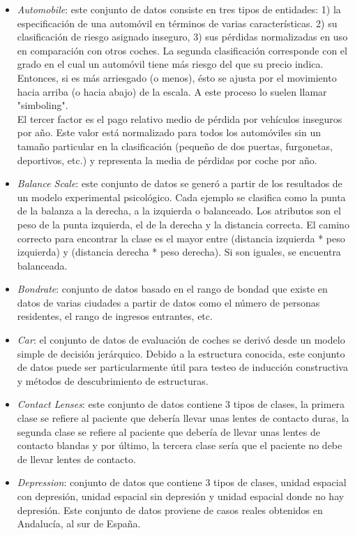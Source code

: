 			\begin{itemize}
				\item \textit{Automobile}: este conjunto de datos consiste en tres tipos de entidades: 1) la especificación de una automóvil en términos de varias características. 2) su clasificación de riesgo asignado inseguro, 3) sus pérdidas normalizadas en uso en comparación con otros coches. La segunda clasificación corresponde con el grado en el cual un automóvil tiene más riesgo del que su precio indica. Entonces, si es más arriesgado (o menos), ésto se ajusta por el movimiento hacia arriba (o hacia abajo) de la escala. A este proceso lo suelen llamar "simboling".\\

El tercer factor es el pago relativo medio de pérdida por vehículos inseguros por año. Este valor está normalizado para todos los automóviles sin un tamaño particular en la clasificación (pequeño de dos puertas, furgonetas, deportivos, etc.) y representa la media de pérdidas por coche por año.
				\item \textit{Balance Scale}: este conjunto de datos se generó a partir de los resultados de un modelo experimental psicológico. Cada ejemplo se clasifica como la punta de la balanza a la derecha, a la izquierda o balanceado. Los atributos son el peso de la punta izquierda, el de la derecha y la distancia correcta. El camino correcto para encontrar la clase es el mayor entre (distancia izquierda * peso izquierda) y (distancia derecha * peso derecha). Si son iguales, se encuentra balanceada.
				\item \textit{Bondrate}: conjunto de datos basado en el rango de bondad que existe en datos de varias ciudades a partir de datos como el número de personas residentes, el rango de ingresos entrantes, etc.
				\item \textit{Car}: el conjunto de datos de evaluación de coches se derivó desde un modelo simple de decisión jerárquico. Debido a la estructura conocida, este conjunto de datos puede ser particularmente útil para testeo de inducción constructiva y métodos de descubrimiento de estructuras.
				\item \textit{Contact Lenses}: este conjunto de datos contiene 3 tipos de clases, la primera clase se refiere al paciente que debería llevar unas lentes de contacto duras, la segunda clase se refiere al paciente que debería de llevar unas lentes de contacto blandas y por último, la tercera clase sería que el paciente no debe de llevar lentes de contacto.
				\item \textit{Depression}: conjunto de datos que contiene 3 tipos de clases, unidad espacial con depresión, unidad espacial sin depresión y unidad espacial donde no hay depresión. Este conjunto de datos proviene de casos reales obtenidos en Andalucía, al sur de España.

\end{itemize}
